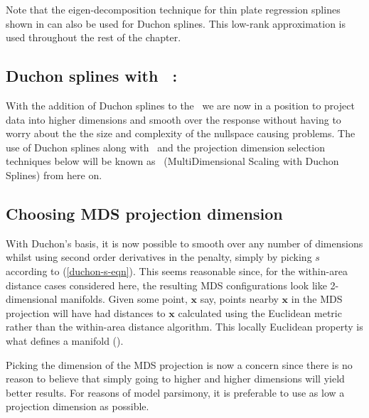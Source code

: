 Note that the eigen-decomposition technique for thin plate regression splines shown in  can also be used for Duchon splines. This low-rank approximation is used throughout the rest of the chapter.



\subsection{Duchon splines with \mdsap\ : \mdsds}\label{cor-5s7}

With the addition of Duchon splines to the \mdsap\ we are now in a position to project data into higher dimensions and smooth over the response without having to worry about the the size and complexity of the nullspace causing problems. The use of Duchon splines along with \mdsap\ and the projection dimension selection techniques below will be known as \mdsds\ (MultiDimensional Scaling with Duchon Splines) from here on.

\subsection{Choosing MDS projection dimension}
\label{gds-dimselect}

With Duchon's basis, it is now possible to smooth over any number of dimensions whilst using second order derivatives in the penalty, simply by picking $s$ according to (\ref{duchon-s-eqn}). This seems reasonable since, for the within-area distance cases considered here, the resulting MDS configurations look like 2-dimensional manifolds. Given some point, $\mathbf{x}$ say, points nearby $\mathbf{x}$ in the MDS projection will have had distances to $\mathbf{x}$ calculated using the Euclidean metric rather than the within-area distance algorithm. This locally Euclidean property is what defines a manifold (\cite[p. 225]{topology}).

Picking the dimension of the MDS projection is now a concern since there is no reason to believe that simply going to higher and higher dimensions will yield better results. For reasons of model parsimony, it is preferable to use as low a projection dimension as possible.

